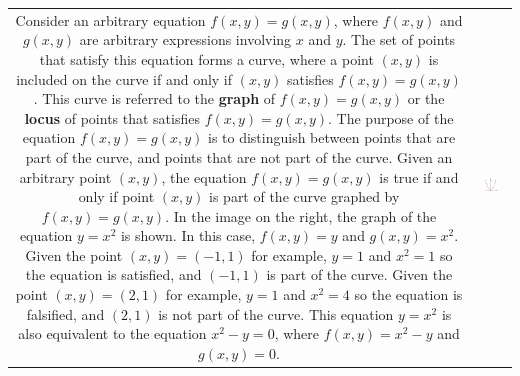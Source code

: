 \documentclass{article}
\begin{document}
\begin{tabular}{cc}
\parbox{0.5\textwidth}{
Consider an arbitrary equation \(f(x,y) = g(x,y)\), where \(f(x,y)\) and \(g(x,y)\) are arbitrary expressions involving \(x\) and \(y\). The set of points that satisfy this equation forms a curve, where a point \((x,y)\) is included on the curve if and only if \((x,y)\) satisfies \(f(x,y) = g(x,y)\). This curve is referred to the {\bf graph} of \(f(x,y) = g(x,y)\) or the {\bf locus} of points that satisfies \(f(x,y) = g(x,y)\). \\
The purpose of the equation \(f(x,y) = g(x,y)\) is to distinguish between points that are part of the curve, and points that are not part of the curve. Given an arbitrary point \((x, y)\), the equation \(f(x,y) = g(x,y)\) is true if and only if point \((x, y)\) is part of the curve graphed by \(f(x,y) = g(x,y)\). \\
In the image on the right, the graph of the equation \(y = x^2\) is shown. In this case, \(f(x, y) = y\) and \(g(x, y) = x^2\). Given the point \((x, y) = (-1, 1)\) for example, \(y = 1\) and \(x^2 = 1\) so the equation is satisfied, and \((-1, 1)\) is part of the curve. Given the point \((x, y) = (2, 1)\) for example, \(y = 1\) and \(x^2 = 4\) so the equation is falsified, and \((2, 1)\) is not part of the curve. \\
This equation \(y = x^2\) is also equivalent to the equation \(x^2 - y = 0\), where \(f(x, y) = x^2 - y\) and \(g(x, y) = 0\).
} & \parbox{0.5\textwidth}{
\includegraphics[width = 0.5\textwidth]{parabola}
}
\end{tabular}
\end{document}
